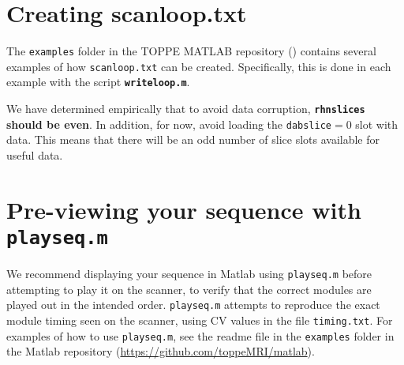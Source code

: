 \section{Creating scanloop.txt}
The {\tt examples} folder in the TOPPE MATLAB repository (\matrep) contains several examples of how {\tt scanloop.txt} can be created.
Specifically, this is done in each example with the script {\tt \bf writeloop.m}.

We have determined empirically that to avoid data corruption, {\bf{\tt rhnslices} should be even}.
In addition, for now, avoid loading the {\tt dabslice}$=0$ slot with data. 
This means that there will be an odd number of slice slots available for useful data.


\section{Pre-viewing your sequence with {\tt playseq.m} }

We recommend displaying your sequence in Matlab using \texttt{playseq.m} before attempting to play it on the scanner, to verify that the correct modules are played out in the intended order.
\texttt{playseq.m} attempts to reproduce the exact module timing seen on the scanner, using CV values in the file \texttt{timing.txt}.
For examples of how to use \texttt{playseq.m}, see the readme file in the {\tt examples} folder in the Matlab repository (\url{https://github.com/toppeMRI/matlab}).






